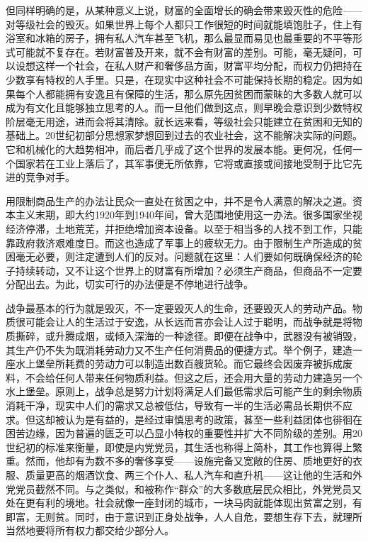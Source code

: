 但同样明确的是，从某种意义上说，财富的全面增长的确会带来毁灭性的危险——对等级社会的毁灭。如果世界上每个人都只工作很短的时间就能填饱肚子，住上有浴室和冰箱的房子，拥有私人汽车甚至飞机，那么最显而易见也最重要的不平等形式可能就不复存在。若财富普及开来，就不会有财富的差别。可能，毫无疑问，可以设想这样一个社会，在私人财产和奢侈品方面，财富平均分配，而权力仍把持在少数享有特权的人手里。只是，在现实中这种社会不可能保持长期的稳定。因为如果每个人都能拥有安逸且有保障的生活，那么原先因贫困而蒙昧的大多数人就可以成为有文化且能够独立思考的人。而一旦他们做到这点，则早晚会意识到少数特权阶层毫无用途，进而会将其清除。就长远来看，等级社会只能建立在贫困和无知的基础上。20世纪初部分思想家梦想回到过去的农业社会，这不能解决实际的问题。它和机械化的大趋势相冲，而后者几乎成了这个世界的发展本能。更何况，任何一个国家若在工业上落后了，其军事便无所依靠，它将或直接或间接地受制于比它先进的竞争对手。

用限制商品生产的办法让民众一直处在贫困之中，并不是令人满意的解决之道。资本主义末期，即大约1920年到1940年间，曾大范围地使用这一办法。很多国家坐视经济停滞，土地荒芜，并拒绝增加资本设备。以至于相当多的人找不到工作，只能靠政府救济艰难度日。而这也造成了军事上的疲软无力。由于限制生产所造成的贫困毫无必要，则注定遭到人们的反对。问题就在这里：人们要如何既确保经济的轮子持续转动，又不让这个世界上的财富有所增加？必须生产商品，但商品不一定要分配出去。为此，切实可行的办法便是不停地进行战争。

战争最基本的行为就是毁灭，不一定要毁灭人的生命，还要毁灭人的劳动产品。物质很可能会让人的生活过于安逸，从长远而言亦会让人过于聪明，而战争就是将物质撕碎，或升腾成烟，或倾入深海的一种途径。即便在战争中，武器没有被销毁，其生产仍不失为既消耗劳动力又不生产任何消费品的便捷方式。举个例子，建造一座水上堡垒所耗费的劳动力可以制造出数百艘货轮。而它最终会因废弃被拆成废料，不会给任何人带来任何物质利益。但这之后，还会用大量的劳动力建造另一个水上堡垒。原则上，战争总是努力计划将满足人们最低需求后可能产生的剩余物质消耗干净，现实中人们的需求又总被低估，导致有一半的生活必需品长期供不应求。但这却被认为是有益的，是经过审慎思考的政策，甚至一些利益团体也徘徊在困苦边缘，因为普遍的匮乏可以凸显小特权的重要性并扩大不同阶级的差别。用20世纪初的标准来衡量，即使是内党党员，其生活也称得上简朴，其工作也算得上繁重。然而，他却有为数不多的奢侈享受——设施完备又宽敞的住房、质地更好的衣服、质量更高的烟酒饮食、两三个仆人、私人汽车和直升机——这让他的生活和外党党员截然不同。与之类似，和被称作``群众''的大多数底层民众相比，外党党员又处在更有利的境地。社会就像一座封闭的城市，一块马肉就能体现出贫富之别，有即富，无则贫。同时，由于意识到正身处战争，人人自危，要想生存下去，就理所当然地要将所有权力都交给少部分人。


